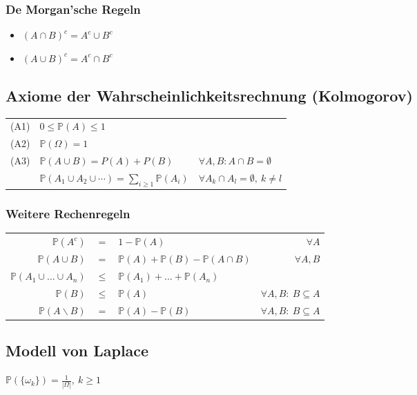 \documentclass[8pt,a4paper]{scrartcl}
\begin{document}
\begin{multicols*}{3}
\subsubsection{De Morgan'sche Regeln}
\begin{itemize}
\item $(A\cap B)^c=A^c\cup B^c$
\item $(A\cup B)^c=A^c\cap B^c$
\end{itemize}


\subsection{Axiome der Wahrscheinlichkeitsrechnung (Kolmogorov)}

\begin{tabular}{lll}
(A1)& $0\leq \mathbb{P}(A)\leq 1$&\\
(A2)& $\mathbb{P}(\Omega)=1$&\\
(A3)& $\mathbb{P}(A\cup B)=P(A)+P(B)$& $\forall A,B: A\cap B = \emptyset$\\
& $\mathbb{P}(A_1\cup A_2\cup\cdots)=\sum\limits_{i\geq 1}\mathbb{P}(A_i)$&$\forall A_k\cap A_l = \emptyset,\ k\neq l$
\end{tabular}

\subsubsection{Weitere Rechenregeln}

\begin{tabular}{rclr}
$\mathbb{P}(A^c)$&=&$1-\mathbb{P}(A)$&$\forall A$\\
$\mathbb{P}(A\cup B)$&=&$\mathbb{P}(A)+\mathbb{P}(B)-\mathbb{P}(A\cap B)$&$\forall A,B$\\
$\mathbb{P}(A_1\cup\ldots\cup A_n)$&$\leq$&$\mathbb{P}(A_1)+\ldots +\mathbb{P}(A_n)$&\\
$\mathbb{P}(B)$&$\leq$&$\mathbb{P}(A)$&$\forall A,B:\ B\subseteq A$\\
$\mathbb{P}(A\backslash B)$&=&$\mathbb{P}(A)-\mathbb{P}(B)$&$\forall A,B:\ B\subseteq A$
\end{tabular}

\subsection{Modell von Laplace}

$\mathbb{P}(\{\omega_k\})=\frac{1}{|\Omega|},\ k\geq 1$


\end{multicols*}
\end{document}
